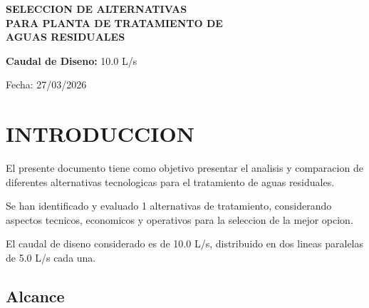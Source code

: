 \documentclass[12pt,a4paper]{article}
\begin{document}
\begin{titlepage}
\centering
\vspace*{2cm}

{\Huge\bfseries\textcolor{azuloscuro}{SELECCION DE ALTERNATIVAS}\\[0.5cm]
\Large PARA PLANTA DE TRATAMIENTO DE\\[0.3cm]
AGUAS RESIDUALES}

\vspace{2cm}

{\Large\textbf{Caudal de Diseno:} 10.0 L/s}

\vspace{1.5cm}


\vfill

{\large Fecha: 27/03/2026}

\end{titlepage}

\newpage
\section{INTRODUCCION}

El presente documento tiene como objetivo presentar el analisis y comparacion 
de diferentes alternativas tecnologicas para el tratamiento de aguas residuales.

Se han identificado y evaluado 1 alternativas de tratamiento, 
considerando aspectos tecnicos, economicos y operativos para la seleccion de la 
mejor opcion.

El caudal de diseno considerado es de 10.0 L/s, 
distribuido en dos lineas paralelas de 5.0 L/s cada una.

\subsection{Alcance}
\end{document}
